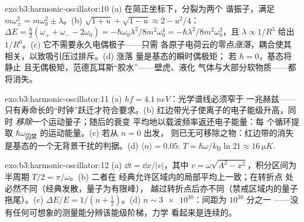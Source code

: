 \begin{solution}{exo:b3:harmonic-oscillator:10}
(a) 在简正坐标下，分裂为两个
谐振子，满足 $m\omega_\pm^2 = m\omega_0^2 \pm \lambda$。(b)
$\sqrt{1 + u} + \sqrt{1 - u} \approx 2 - u^2/4$：$\Delta E =
\tfrac\hbar2(\omega_+ + \omega_- - 2\omega_0) =
-\hbar\omega_0\lambda^2/8m^2\omega_0^4 =
-\hbar\lambda^2/8m^2\omega_0^3$，且 $\lambda \propto 1/R^3$ 给出
$1/R^6$。(c) 它不需要永久电偶极子——只需
各原子电荷云的零点\emph{涨落}，耦合使其
相关，以致吸引压过排斥。(d) 涨落
量是基态的瞬时偶极矩；
若 $\hbar = 0$，基态将静止
且无偶极矩，范德瓦耳斯“胶水”——壁虎、液化
气体与大部分软物质——都将消失。
\end{solution}

\begin{solution}{exo:b3:harmonic-oscillator:11}
(a) $hf = \qty{4.1}{neV}$：光学谱线必须窄于
一兆赫兹——只有寿命长的“时钟”跃迁才符合要求。(b)
红边带光子使离子的电子能级升高，同时
\emph{移除}一个运动量子；随后的衰变
平均地以载波频率返还电子能量：每
个循环提取 $\hbar\omega_{\text{囚禁}}$ 的运动能量。(c) 若从 $n = 0$ 出发，
则已无可移除之物：红边带的消失
是基态的一个无背景干扰的判据。(d)
$\langle n\rangle = 0.05$: $T = \hbar\omega/k_{\text{B}}\ln21
\approx \qty{16}{\micro K}$.
\end{solution}

\begin{solution}{exo:b3:harmonic-oscillator:12}
(a) $\dd t = \dd x/|v|$，其中 $v = \omega\sqrt{A^2 - x^2}$，积分区间为
半周期 $T/2 = \pi/\omega$。(b) 二者在
经典允许区域内的局部平均上一致；在转折点
处必然不同（经典发散，量子为有限峰），
越过转折点后亦不同（禁戒区域内的量子拖尾）。(c) $\Delta E/E = 1/(n +
\tfrac12)$。(d) $n \sim \num{3e30}$：间距为 $10^{30}$ 分之一
——没有任何可想象的测量能分辨该能级阶梯，力学
看起来是连续的。
\end{solution}

